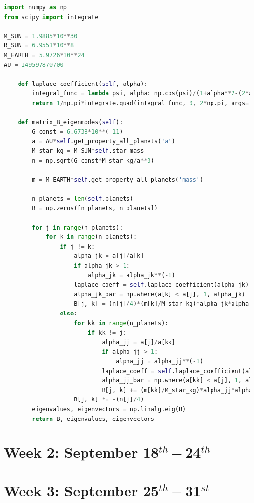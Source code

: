 \documentclass[11pt, oneside]{article}   	%
\begin{document}
\begin{lstlisting}[language=Python, caption={Calculate the frequency matrix, $\mathbf{B}$}]
import numpy as np
from scipy import integrate

M_SUN = 1.9885*10**30
R_SUN = 6.9551*10**8
M_EARTH = 5.9726*10**24
AU = 149597870700

    def laplace_coefficient(self, alpha):
        integral_func = lambda psi, alpha: np.cos(psi)/(1+alpha**2-(2*alpha*np.cos(psi)))**(3./2.)
        return 1/np.pi*integrate.quad(integral_func, 0, 2*np.pi, args=(alpha,))[0]
        
    def matrix_B_eigenmodes(self):
        G_const = 6.6738*10**(-11)
        a = AU*self.get_property_all_planets('a')
        M_star_kg = M_SUN*self.star_mass
        n = np.sqrt(G_const*M_star_kg/a**3)

        m = M_EARTH*self.get_property_all_planets('mass')

        n_planets = len(self.planets)
        B = np.zeros([n_planets, n_planets])

        for j in range(n_planets):
            for k in range(n_planets):
                if j != k:
                    alpha_jk = a[j]/a[k]
                    if alpha_jk > 1:
                        alpha_jk = alpha_jk**(-1)
                    laplace_coeff = self.laplace_coefficient(alpha_jk)
                    alpha_jk_bar = np.where(a[k] < a[j], 1, alpha_jk)
                    B[j, k] = (n[j]/4)*(m[k]/M_star_kg)*alpha_jk*alpha_jk_bar*laplace_coeff
                else:
                    for kk in range(n_planets):
                        if kk != j:
                            alpha_jj = a[j]/a[kk]
                            if alpha_jj > 1:
                                alpha_jj = alpha_jj**(-1)
                            laplace_coeff = self.laplace_coefficient(alpha_jj)
                            alpha_jj_bar = np.where(a[kk] < a[j], 1, alpha_jj)
                            B[j, k] += (m[kk]/M_star_kg)*alpha_jj*alpha_jj_bar*laplace_coeff
                    B[j, k] *= -(n[j]/4)
        eigenvalues, eigenvectors = np.linalg.eig(B)
        return B, eigenvalues, eigenvectors
\end{lstlisting}

\section{Week 2: September 18$^{th} - $24$^{th}$}

\newpage


\section{Week 3: September 25$^{th} - $31$^{st}$}
\end{document}
